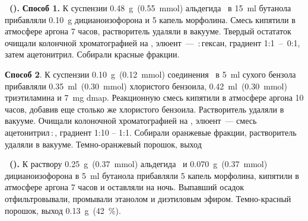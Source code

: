 
\textbf{~().} \textbf{Способ 1.} К суспензии \SI{0.48}{\gram}~(\SI{0.55}{\mmol}) альдегида~\textbf{} в \SI{15}{\milli\litre} бутанола прибавляли \SI{0.10}{\gram} дицианоизофорона и 5 капель морфолина. Смесь кипятили в атмосфере аргона 7 часов, растворитель удаляли в вакууме. Твердый остататок очищали колончной хроматографией на , элюент~--- \,:\,гексан, градиент 1:1~--~0:1, затем ацетонитрил. Собирали красные фракции.

\textbf{Способ 2}.  К суспензии \SI{0.10}{\gram}~(\SI{0.12}{\mmol}) соединения~\textbf{} в \SI{5}{\milli\litre} сухого бензола прибавляли \SI{0.35}{\milli\litre}~(\SI{0.30}{\mmol}) хлористого бензоила, \SI{0.42}{\milli\litre}~(\SI{0.30}{\mmol}) триэтиламина и \SI{7}{\milli\gram} \ac{dmap}. 
Реакционную смесь кипятили в атмосфере аргона 10 часов, добавив еще столько же хлористого бензоила. 
Растворитель удаляли в вакууме. Очищали колоночной хроматографией на , элюент~--- смесь ацетонитрил\,:\,, градиент 1:10 -- 1:1.
Собирали оранжевые фракции, растворитель удаляли в вакууме. Темно-оранжевый порошок, выход

\textbf{~().} К раствору \SI{0.25}{\gram}~(\SI{0.37}{\mmol}) альдегида~\textbf{} и \SI{0.070}{\gram}~(\SI{0.37}{\mmol}) дицианоизофорона в \SI{5}{\milli\litre} бутанола прибавляли 5 капель морфолина, кипятили в атмосфере аргона 7 часов и оставляли на ночь. Выпавший осадок отфильтровывали, промывали этанолом и диэтиловым эфиром. Темно-красный порошок, выход \SI{0.13}{\gram}~(\SI{42}{\percent}).

